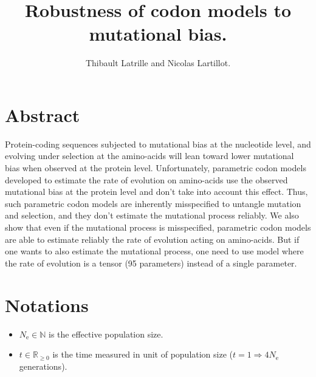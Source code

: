 \documentclass{article}
\author{Thibault Latrille and Nicolas Lartillot.}
\title{Robustness of codon models to mutational bias.}
\newcommand{\Ne}{N_\mathrm{e}}
\begin{document}
    \maketitle

    \section*{Abstract}

    Protein-coding sequences subjected to mutational bias at the nucleotide level, and evolving under selection at the amino-acids will lean toward lower mutational bias when observed at the protein level. Unfortunately, parametric codon models developed to estimate the rate of evolution on amino-acids use the observed mutational bias at the protein level and don't take into account this effect. Thus, such parametric codon models are inherently misspecified to untangle mutation and selection, and they don't estimate the mutational process reliably. We also show that even if the mutational process is misspecified, parametric codon models are able to estimate reliably the rate of evolution acting on amino-acids. But if one wants to also estimate the mutational process, one need to use model where the rate of evolution is a tensor (95 parameters) instead of a single parameter.


    \tableofcontents
    \newpage

    \section{Notations}

    \begin{itemize}
        \item $\Ne \in \mathbb{N}$ is the effective population size.
        \item $t \in \mathbb{R}_{\geq 0}$ is the time measured in unit of population size ($t=1 \Rightarrow 4 \Ne $ generations).
    \end{itemize}
\end{document}
